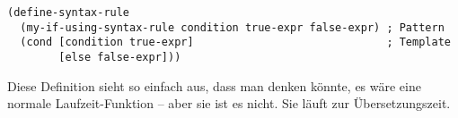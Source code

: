 % 




\begin{lstlisting}
(define-syntax-rule 
  (my-if-using-syntax-rule condition true-expr false-expr) ; Pattern
  (cond [condition true-expr]                              ; Template
        [else false-expr]))
\end{lstlisting}

Diese Definition sieht so einfach aus, dass man denken könnte, es wäre eine normale Laufzeit-Funktion -- aber sie ist es nicht. Sie läuft zur Übersetzungszeit. 

